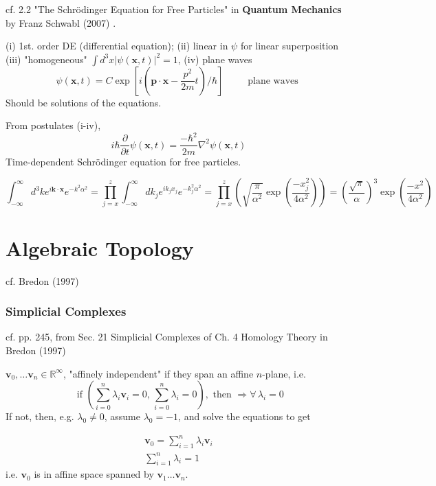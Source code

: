 \documentclass[10pt]{amsart}
\begin{document}
\begin{multicols*}{2}
cf. 2.2 "The Schr\"{o}dinger Equation for Free Particles" in \textbf{Quantum Mechanics} by Franz Schwabl (2007) \cite{FrSc2007}.

(i) 1st. order DE (differential equation); (ii) linear in $\psi$ for linear superposition (iii) "homogeneous" $\int d^3x | \psi(\mathbf{x}, t) |^2 = 1$, (iv) plane waves
\[
\psi(\mathbf{x},t) = C \exp{ \left[ i (\mathbf{p} \cdot \mathbf{x} - \frac{p^2}{2m} t)/ \hbar\right]} \qquad \, \text{ plane waves }
\]
Should be solutions of the equations.

From postulates (i-iv),
\[
i \hbar \frac{\partial}{ \partial t} \psi(\mathbf{x}, t) = \frac{ -\hbar^2}{2m } \nabla^2 \psi(\mathbf{x},t)
\]
Time-dependent Schr\"{o}dinger equation for free particles.

\[
\int_{-\infty}^{\infty} d^3k e^{i\mathbf{k} \cdot \mathbf{x}} e^{-k^2 \alpha^2} = \prod_{j=x}^z \int_{-\infty}^{\infty} dk_j e^{ik_j x_j} e^{-k_j^2 \alpha^2}  = \prod_{j=x}^z \left( \sqrt{ \frac{\pi}{\alpha^2} } \exp{ \left( \frac{-x_j^2}{4\alpha^2} \right)} \right) = \left( \frac{\sqrt{\pi}}{\alpha} \right)^3 \exp{ \left( \frac{-x^2}{4\alpha^2} \right)}
\]


\part{Algebraic Topology}  

cf. Bredon (1997) \cite{Bred1997}


\section{Simplicial Complexes}  

cf. pp. 245, from Sec. 21 Simplicial Complexes of Ch. 4 Homology Theory in Bredon (1997) \cite{Bred1997}

$\mathbf{v}_0, \dots \mathbf{v}_n \in \mathbb{R}^{\infty}$, "affinely independent" if they span an affine $n$-plane, i.e. 
\[
\text{ if } \left( \sum_{i=0}^n \lambda_i \mathbf{v}_i =0 , \, \sum_{i=0}^n \lambda_i = 0 \right), \text{ then } \Longrightarrow \forall \, \lambda_i = 0
\]
If not, then, e.g. $\lambda_0 \neq 0$, assume $\lambda_0 =-1$, and solve the equations to get 

\[
\begin{gathered}
\mathbf{v}_0 = \sum_{i=1}^n \lambda_i \mathbf{v}_i \\
\sum_{i=1}^n \lambda_i = 1
\end{gathered}
\]
i.e. $\mathbf{v}_0$ is in affine space spanned by $\mathbf{v}_1\dots \mathbf{v}_n$.  


\end{multicols*}
\end{document}
